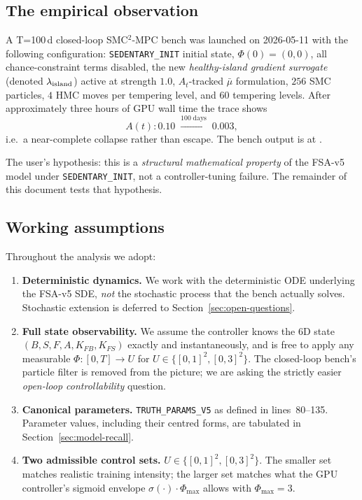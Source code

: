 \documentclass[11pt,a4paper]{article}
\theoremstyle{definition}
\begin{document}
\subsection{The empirical observation}

A T=100\,d closed-loop SMC$^2$-MPC bench was launched on 2026-05-11 with the following configuration: \texttt{SEDENTARY\_INIT} initial state, $\Phi(0) = (0,0)$, all chance-constraint terms disabled, the new \emph{healthy-island gradient surrogate} (denoted $\lambda_{\rm island}$) active at strength $1.0$, $A_t$-tracked $\bar\mu$ formulation, $256$ SMC particles, $4$ HMC moves per tempering level, and $60$ tempering levels. After approximately three hours of GPU wall time the trace shows
\[
A(t) : 0.10 \;\xrightarrow{100\;\text{days}}\; 0.003,
\]
i.e.\ a near-complete collapse rather than escape. The bench output is at .

The user's hypothesis: this is a \emph{structural mathematical property} of the FSA-v5 model under \texttt{SEDENTARY\_INIT}, not a controller-tuning failure. The remainder of this document tests that hypothesis.

\subsection{Working assumptions}

Throughout the analysis we adopt:

\begin{enumerate}
  \item \textbf{Deterministic dynamics.} We work with the deterministic ODE underlying the FSA-v5 SDE, \emph{not} the stochastic process that the bench actually solves. Stochastic extension is deferred to Section~\ref{sec:open-questions}.
  \item \textbf{Full state observability.} We assume the controller knows the 6D state $(B,S,F,A,K_{FB},K_{FS})$ exactly and instantaneously, and is free to apply any measurable $\Phi \colon [0,T] \to U$ for $U \in \{[0,1]^2, [0,3]^2\}$. The closed-loop bench's particle filter is removed from the picture; we are asking the strictly easier \emph{open-loop controllability} question.
  \item \textbf{Canonical parameters.} \texttt{TRUTH\_PARAMS\_V5} as defined in  lines~80--135. Parameter values, including their centred forms, are tabulated in Section~\ref{sec:model-recall}.
  \item \textbf{Two admissible control sets.} $U \in \{[0,1]^2, [0,3]^2\}$. The smaller set matches realistic training intensity; the larger set matches what the GPU controller's sigmoid envelope $\sigma(\cdot) \cdot \Phi_{\max}$ allows with $\Phi_{\max} = 3$.
\end{enumerate}
\end{document}
